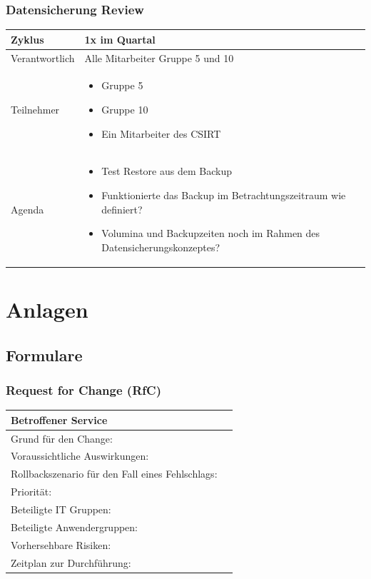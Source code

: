 \documentclass[]{article}
\begin{document}
\subsubsection{Datensicherung Review}\label{datensicherung-review}

\begin{longtable}{lp{6cm}}
\toprule
Zyklus & 1x im Quartal\tabularnewline
\midrule
\endhead
Verantwortlich & Alle Mitarbeiter Gruppe 5 und 10\tabularnewline
Teilnehmer & \begin{itemize}
\item
  Gruppe 5
\item
  Gruppe 10
\item
  Ein Mitarbeiter des CSIRT
\end{itemize}\tabularnewline
Agenda & \begin{itemize}
\item
  Test Restore aus dem Backup
\item
  Funktionierte das Backup im Betrachtungszeitraum wie definiert?
\item
  Volumina und Backupzeiten noch im Rahmen des Datensicherungskonzeptes?
\end{itemize}\tabularnewline
\bottomrule
\end{longtable}

\protect\hypertarget{ux5fToc457467708}{}{}

\section{Anlagen}\label{anlagen}

\subsection{Formulare}\label{formulare}

\subsubsection{Request for Change (RfC)}\label{request-for-change-rfc}

\begin{longtable}{|p{6cm}|p{6cm}|}
\toprule
Betroffener Service &\tabularnewline
\midrule
Grund für den Change: & \tabularnewline
Voraussichtliche Auswirkungen: &\tabularnewline
Rollbackszenario für den Fall eines Fehlschlags: &\tabularnewline
Priorität: &\tabularnewline
Beteiligte IT Gruppen: &\tabularnewline
Beteiligte Anwendergruppen: &\tabularnewline
Vorhersehbare Risiken: &\tabularnewline
Zeitplan zur Durchführung: &\tabularnewline
\bottomrule
\end{longtable}
\end{document}
